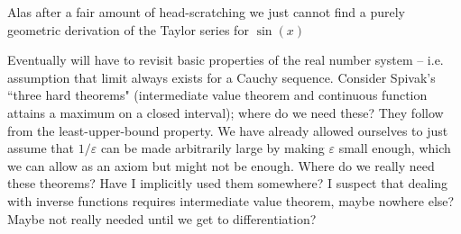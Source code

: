 
Alas after a fair amount of head-scratching we just cannot find a purely geometric derivation of the Taylor series for $\sin(x)$

Eventually will have to revisit basic properties of the real number system -- i.e. assumption that limit always exists for a Cauchy sequence. Consider Spivak's ``three hard theorems" (intermediate value theorem and continuous function attains a maximum on a closed interval); where do we need these? They follow from the least-upper-bound property. We have already allowed ourselves to just assume that $1/\varepsilon$ can be made arbitrarily large by making $\varepsilon$ small enough, which we can allow as an axiom but might not be enough. Where do we really need these theorems? Have I implicitly used them somewhere? I suspect that dealing with inverse functions requires intermediate value theorem, maybe nowhere else? Maybe not really needed until we get to differentiation?